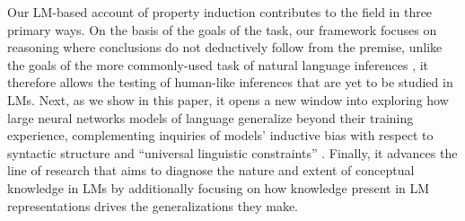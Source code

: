 \documentclass[10pt,letterpaper]{article}
\begin{document}
Our LM-based account of property induction contributes to the field in three primary ways. 
On the basis of the goals of the task, our framework focuses on reasoning where conclusions do not deductively follow from the premise, unlike the goals of the more commonly-used task of natural language inferences \citep{bowman2015large}, it therefore allows the testing of human-like inferences that are yet to be studied in LMs.
Next, as we show in this paper, it opens a new window into exploring how large neural networks models of language generalize beyond their training experience, complementing inquiries of models' inductive bias with respect to syntactic structure \citep{mccoy2020does} and ``universal linguistic constraints'' \citep{mccoy2020universal}. Finally, it advances the line of research that aims to diagnose the nature and extent of conceptual knowledge in LMs \citep{da-kasai-2019-cracking, weir2020probing} by additionally focusing on how knowledge present in LM representations drives the generalizations they make.





\end{document}
